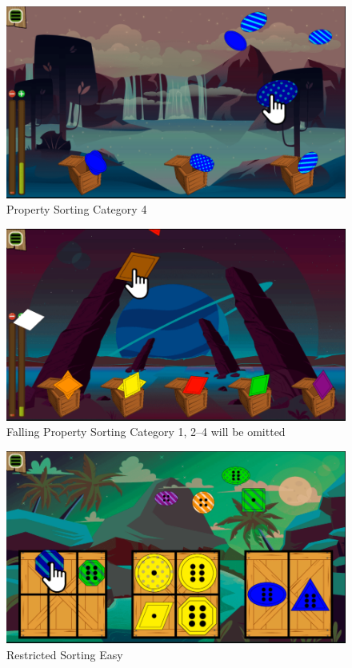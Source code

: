 \begin{figure}[H]
    \centering
    \includegraphics[width=1\textwidth]{figures/property4}
    \caption{Property Sorting Category 4}
    \label{fig:property4}
\end{figure}

\begin{figure}[H]
    \centering
    \includegraphics[width=1\textwidth]{figures/falling}
    \caption{Falling Property Sorting Category 1, 2--4 will be omitted}
    \label{fig:falling}
\end{figure}

\begin{figure}[H]
    \centering
    \includegraphics[width=1\textwidth]{figures/restricted1}
    \caption{Restricted Sorting Easy}
    \label{fig:restricted1}
\end{figure}

